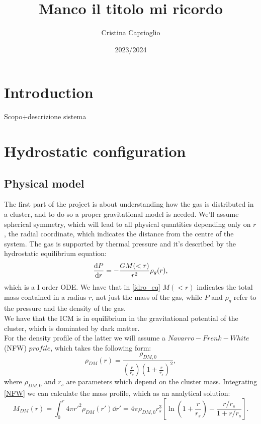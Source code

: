 \documentclass{article}
\title{Manco il titolo mi ricordo}
\author{Cristina Caprioglio}
\date{2023/2024 }
\begin{document}
\maketitle

\section*{Introduction}
Scopo+descrizione sistema
\section{Hydrostatic configuration}
\subsection{Physical model}
The first part of the project is about understanding how the gas is distributed in a cluster, and to do so a proper gravitational model is needed.
We'll assume spherical symmetry, which will lead to all physical quantities depending only on $r$, the radial coordinate, which indicates the distance from the centre of the system.
The gas is supported by thermal pressure and it's described by the hydrostatic equilibrium equation:
\begin{equation}\label{idro_eq}
	\derivative{P}{r}=-\frac{GM(<r)}{r^{2}}\rho_{g}(r),
\end{equation}
which is a I order ODE. We have that in \eqref{idro_eq} $M(<r)$ indicates the total mass contained in a radius $r$, not just the mass of the gas, while $P$ and $\rho_{g}$ refer to the pressure and the density of the gas. \\
We have that the ICM is in equilibrium in the gravitational potential of the cluster, which is dominated by dark matter. \\
For the density profile of the latter we will assume a $Navarro-Frenk-White$ (NFW) $profile$, which takes the following form:
\begin{equation}\label{NFW}
	\rho_{DM}(r)=\frac{\rho_{DM,0}}{\left(\frac{r}{r_{s}}\right)\left(1+\frac{r}{r_{s}}\right)^{2}},
\end{equation}
where $\rho_{DM,0}$ and $r_{s}$ are parameters which depend on the cluster mass. 
Integrating \eqref{NFW} we can calculate the mass profile, which as an analytical solution:
\begin{equation}\label{massDM}
	M_{DM}(r)=\int_{0}^{r}4\pi r'^{2}\rho_{DM}(r')\dd{r'}=4\pi\rho_{DM,0}r_{s}^{3}\left[\ln\left(1+\frac{r}{r_{s}}\right)-\frac{r/r_{s}}{1+r/r_{s}}\right].
\end{equation}
\end{document}
